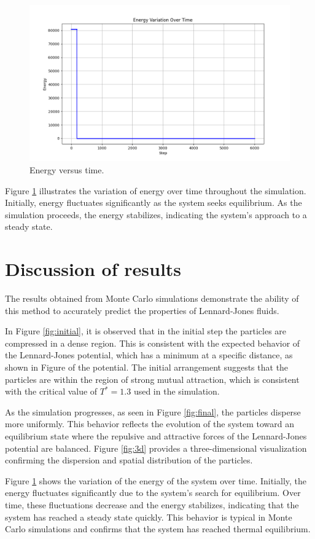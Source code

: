 \documentclass[a4paper,12pt]{article}
\begin{document}
\begin{figure}[H]
    \centering
    \includegraphics[width=13cm]{images/05.png}
    \caption{Energy versus time.}
    \label{fig:energy}
\end{figure}

Figure \ref{fig:energy} illustrates the variation of energy over time throughout the simulation. Initially, energy fluctuates significantly as the system seeks equilibrium. As the simulation proceeds, the energy stabilizes, indicating the system's approach to a steady state.



\section{Discussion of results}
\begin{multicols}{2}
The results obtained from Monte Carlo simulations demonstrate the ability of this method to accurately predict the properties of Lennard-Jones fluids. 

In Figure \ref{fig:initial}, it is observed that in the initial step the particles are compressed in a dense region. This is consistent with the expected behavior of the Lennard-Jones potential, which has a minimum at a specific distance, as shown in Figure of the potential. The initial arrangement suggests that the particles are within the region of strong mutual attraction, which is consistent with the critical value of \( T^* = 1.3 \) used in the simulation.

As the simulation progresses, as seen in Figure \ref{fig:final}, the particles disperse more uniformly. This behavior reflects the evolution of the system toward an equilibrium state where the repulsive and attractive forces of the Lennard-Jones potential are balanced. Figure \ref{fig:3d} provides a three-dimensional visualization confirming the dispersion and spatial distribution of the particles.

Figure \ref{fig:energy} shows the variation of the energy of the system over time. Initially, the energy fluctuates significantly due to the system's search for equilibrium. Over time, these fluctuations decrease and the energy stabilizes, indicating that the system has reached a steady state quickly. This behavior is typical in Monte Carlo simulations and confirms that the system has reached thermal equilibrium.
\end{multicols}
\end{document}
